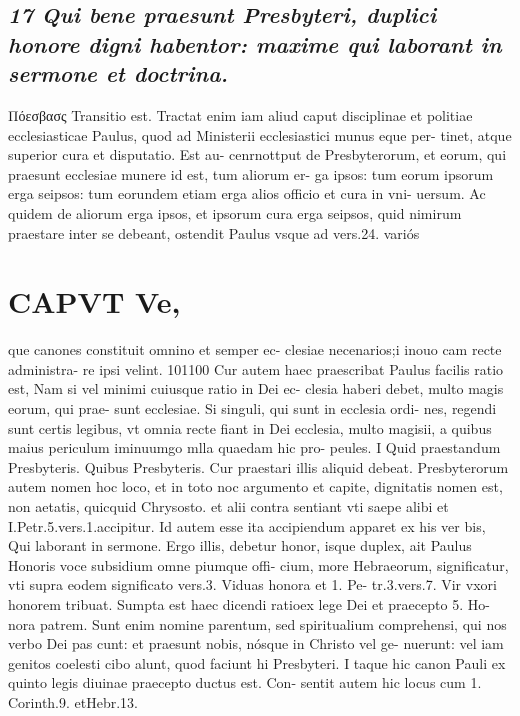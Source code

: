 \documentclass{article}
\begin{document}
\begin{pages}
\subsection*{\textit{17 Qui bene praesunt Presbyteri, duplici honore digni habentor: maxime qui laborant in sermone et doctrina. }}\pstart Πόεσβασς Transitio est. Tractat enim iam aliud caput disciplinae et politiae ecclesiasticae Paulus, quod ad Ministerii ecclesiastici munus eque per- tinet, atque superior cura et disputatio. Est au- cenrnottput de Presbyterorum, et eorum, qui praesunt ecclesiae munere id est, tum aliorum er- ga ipsos: tum eorum ipsorum erga seipsos: tum eorundem etiam erga alios officio et cura in vni- uersum.  \pend\pstart Ac quidem de aliorum erga ipsos, et ipsorum cura erga seipsos, quid nimirum praestare inter se debeant, ostendit Paulus vsque ad vers.24. variós  \pend
\section*{CAPVT Ve, }\pstart que canones constituit omnino et semper ec- clesiae necenarios;i inouo cam recte administra- re ipsi velint. 101100  \pend\pstart Cur autem haec praescribat Paulus facilis ratio est, Nam si vel minimi cuiusque ratio in Dei ec- clesia haberi debet, multo magis eorum, qui prae- sunt ecclesiae. Si singuli, qui sunt in ecclesia ordi- nes, regendi sunt certis legibus, vt omnia recte fiant in Dei ecclesia, multo magisii, a quibus maius periculum iminuumgo mlla quaedam hic pro- peules.  \pend\pstart I Quid praestandum Presbyteris.  \pend{} Quibus Presbyteris.  \pend{} Cur praestari illis aliquid debeat.  \pend\pstart Presbyterorum autem nomen hoc loco, et in toto noc argumento et capite, dignitatis nomen est, non aetatis, quicquid Chrysosto. et alii contra sentiant vti saepe alibi et I.Petr.5.vers.1.accipitur. Id autem esse ita accipiendum apparet ex his ver bis, Qui laborant in sermone.  \pend\pstart Ergo illis, debetur honor, isque duplex, ait Paulus Honoris voce subsidium omne piumque offi- cium, more Hebraeorum, significatur, vti supra eodem significato vers.3. Viduas honora et 1. Pe- tr.3.vers.7. Vir vxori honorem tribuat. Sumpta est haec dicendi ratioex lege Dei et praecepto 5. Ho- nora patrem. Sunt enim nomine parentum, sed spiritualium comprehensi, qui nos verbo Dei pas cunt: et praesunt nobis, nósque in Christo vel ge- nuerunt: vel iam genitos coelesti cibo alunt, quod faciunt hi Presbyteri. I taque hic canon Pauli ex quinto legis diuinae praecepto ductus est. Con- sentit autem hic locus cum 1. Corinth.9. etHebr.13.  \pend

\end{pages}
\end{document}

